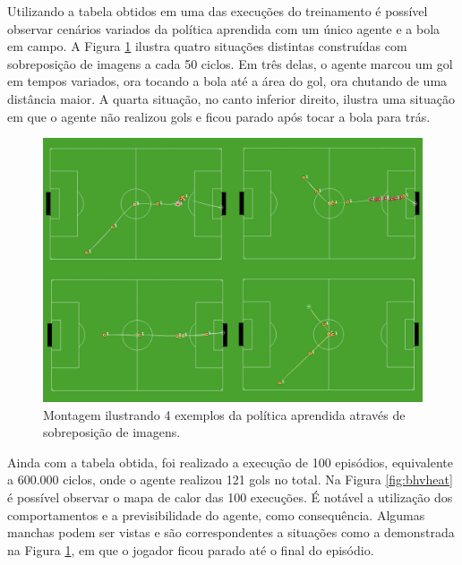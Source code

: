 Utilizando a tabela obtidos em uma das execuções do treinamento é possível observar cenários variados da política aprendida com um único agente e a bola em campo. A Figura \ref{fig:behaviors-result} ilustra quatro situações distintas construídas com sobreposição de imagens a cada 50 ciclos. Em três delas, o agente marcou um gol em tempos variados, ora tocando a bola até a área do gol, ora chutando de uma distância maior. A quarta situação, no canto inferior direito, ilustra uma situação em que o agente não realizou gols e ficou parado após tocar a bola para trás.

\begin{figure}[H]
	\includegraphics[width=1\linewidth]{figs/behaviors-result.jpg}
	\centering
	\caption{Montagem ilustrando 4 exemplos da política aprendida através de sobreposição de imagens.}
	\label{fig:behaviors-result}
\end{figure}

Ainda com a tabela obtida, foi realizado a execução de 100 episódios, equivalente a 600.000 ciclos, onde o agente realizou 121 gols no total. Na Figura \ref{fig:bhvheat} é possível observar o mapa de calor das 100 execuções. É notável a utilização dos comportamentos e a previsibilidade do agente, como consequência. Algumas manchas podem ser vistas e são correspondentes a situações como a demonstrada na Figura \ref{fig:behaviors-result}, em que o jogador ficou parado até o final do episódio.


